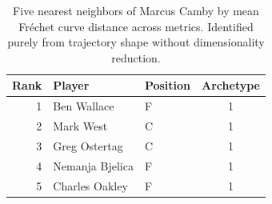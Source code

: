 \begin{table}[htbp]
  \centering\small
  \begin{tabular}{rllc}
    \toprule
    Rank & Player & Position & Archetype \\
    \midrule
    1 & Ben Wallace & F & 1 \\
    2 & Mark West & C & 1 \\
    3 & Greg Ostertag & C & 1 \\
    4 & Nemanja Bjelica & F & 1 \\
    5 & Charles Oakley & F & 1 \\
    \bottomrule
  \end{tabular}
  \caption{Five nearest neighbors of Marcus Camby by mean Fr\'{e}chet curve distance across metrics. Identified purely from trajectory shape without dimensionality reduction.}
  \label{tab:Marcus_Camby_frechet_curve_neighbors}
\end{table}

